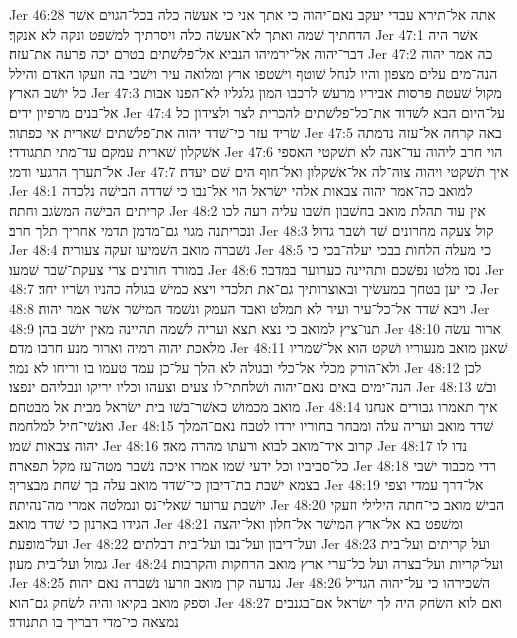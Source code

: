 Jer 46:28  אתה אל־תירא עבדי יעקב נאם־יהוה כי אתך אני כי אעשׂה כלה בכל־הגוים אשׁר הדחתיך שׁמה ואתך לא־אעשׂה כלה ויסרתיך למשׁפט ונקה לא אנקך׃
Jer 47:1  אשׁר היה דבר־יהוה אל־ירמיהו הנביא אל־פלשׁתים בטרם יכה פרעה את־עזה׃
Jer 47:2  כה אמר יהוה הנה־מים עלים מצפון והיו לנחל שׁוטף וישׁטפו ארץ ומלואה עיר וישׁבי בה וזעקו האדם והילל כל יושׁב הארץ׃
Jer 47:3  מקול שׁעטת פרסות אביריו מרעשׁ לרכבו המון גלגליו לא־הפנו אבות אל־בנים מרפיון ידים׃
Jer 47:4  על־היום הבא לשׁדוד את־כל־פלשׁתים להכרית לצר ולצידון כל שׂריד עזר כי־שׁדד יהוה את־פלשׁתים שׁארית אי כפתור׃
Jer 47:5  באה קרחה אל־עזה נדמתה אשׁקלון שׁארית עמקם עד־מתי תתגודדי׃
Jer 47:6  הוי חרב ליהוה עד־אנה לא תשׁקטי האספי אל־תערך הרגעי ודמי׃
Jer 47:7  איך תשׁקטי ויהוה צוה־לה אל־אשׁקלון ואל־חוף הים שׁם יעדה׃
Jer 48:1  למואב כה־אמר יהוה צבאות אלהי ישׂראל הוי אל־נבו כי שׁדדה הבישׁה נלכדה קריתים הבישׁה המשׂגב וחתה׃
Jer 48:2  אין עוד תהלת מואב בחשׁבון חשׁבו עליה רעה לכו ונכריתנה מגוי גם־מדמן תדמי אחריך תלך חרב׃
Jer 48:3  קול צעקה מחרונים שׁד ושׁבר גדול׃
Jer 48:4  נשׁברה מואב השׁמיעו זעקה צעוריה׃
Jer 48:5  כי מעלה הלחות בבכי יעלה־בכי כי במורד חורנים צרי צעקת־שׁבר שׁמעו׃
Jer 48:6  נסו מלטו נפשׁכם ותהיינה כערוער במדבר׃
Jer 48:7  כי יען בטחך במעשׂיך ובאוצרותיך גם־את תלכדי ויצא כמישׁ בגולה כהניו ושׂריו יחד׃
Jer 48:8  ויבא שׁדד אל־כל־עיר ועיר לא תמלט ואבד העמק ונשׁמד המישׁר אשׁר אמר יהוה׃
Jer 48:9  תנו־ציץ למואב כי נצא תצא ועריה לשׁמה תהיינה מאין יושׁב בהן׃
Jer 48:10  ארור עשׂה מלאכת יהוה רמיה וארור מנע חרבו מדם׃
Jer 48:11  שׁאנן מואב מנעוריו ושׁקט הוא אל־שׁמריו ולא־הורק מכלי אל־כלי ובגולה לא הלך על־כן עמד טעמו בו וריחו לא נמר׃
Jer 48:12  לכן הנה־ימים באים נאם־יהוה ושׁלחתי־לו צעים וצעהו וכליו יריקו ונבליהם ינפצו׃
Jer 48:13  ובשׁ מואב מכמושׁ כאשׁר־בשׁו בית ישׂראל מבית אל מבטחם׃
Jer 48:14  איך תאמרו גבורים אנחנו ואנשׁי־חיל למלחמה׃
Jer 48:15  שׁדד מואב ועריה עלה ומבחר בחוריו ירדו לטבח נאם־המלך יהוה צבאות שׁמו׃
Jer 48:16  קרוב איד־מואב לבוא ורעתו מהרה מאד׃
Jer 48:17  נדו לו כל־סביביו וכל ידעי שׁמו אמרו איכה נשׁבר מטה־עז מקל תפארה׃
Jer 48:18  רדי מכבוד ישׁבי בצמא ישׁבת בת־דיבון כי־שׁדד מואב עלה בך שׁחת מבצריך׃
Jer 48:19  אל־דרך עמדי וצפי יושׁבת ערוער שׁאלי־נס ונמלטה אמרי מה־נהיתה׃
Jer 48:20  הבישׁ מואב כי־חתה הילילי וזעקי הגידו בארנון כי שׁדד מואב׃
Jer 48:21  ומשׁפט בא אל־ארץ המישׁר אל־חלון ואל־יהצה ועל־מופעת׃
Jer 48:22  ועל־דיבון ועל־נבו ועל־בית דבלתים׃
Jer 48:23  ועל קריתים ועל־בית גמול ועל־בית מעון׃
Jer 48:24  ועל־קריות ועל־בצרה ועל כל־ערי ארץ מואב הרחקות והקרבות׃
Jer 48:25  נגדעה קרן מואב וזרעו נשׁברה נאם יהוה׃
Jer 48:26  השׁכירהו כי על־יהוה הגדיל וספק מואב בקיאו והיה לשׂחק גם־הוא׃
Jer 48:27  ואם לוא השׂחק היה לך ישׂראל אם־בגנבים נמצאה כי־מדי דבריך בו תתנודד׃
